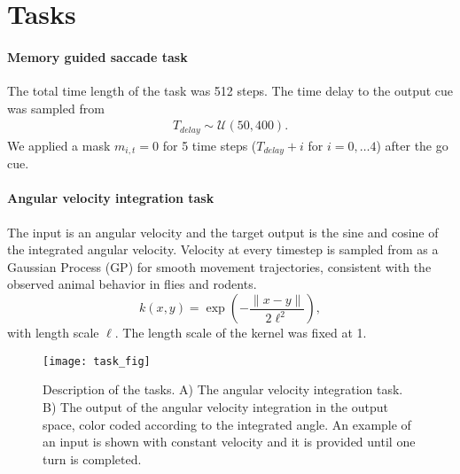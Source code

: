\documentclass{article} %
\newcounter{ct}
\theoremstyle{definition}
\theoremstyle{remark}
\begin{document}
\newpage
\newpage
\section{Tasks}\label{sec:supp:tasks}


\paragraph{Memory guided saccade task}

The total time length of the task was 512 steps.
The time delay to the output cue was sampled from 
\begin{align}
T_{delay} \sim \mathcal{U}(50, 400).
\end{align}
We applied a mask $m_{i,t}=0$ for 5 time steps ($T_{delay}+i$ for $i=0,\dots 4$) after the go cue.



\paragraph{Angular velocity integration task}
The input is an angular velocity and the target output is the sine and cosine of the integrated angular velocity.
Velocity at every timestep  is sampled from as a Gaussian Process (GP) for smooth movement trajectories, consistent with the observed animal behavior in flies and rodents.
\begin{equation}
k(x,y)=\exp\left(-\frac{\|x-y\|}{2\ell^2}\right),
\end{equation}
with length scale $\ell$.
 The length scale of the kernel was fixed at 1.
 
 \begin{figure}[tbhp]
     \centering
    \texttt{[image: task\_fig]}
       \caption{Description of the tasks. A) The angular velocity integration task. B) The output of the angular velocity integration in the output space, color coded according to the integrated angle. An example of an input is shown with constant velocity and it is provided until one turn is completed.}
         \label{fig:angular_task}
\end{figure}

 
 
 
 
\end{document}
